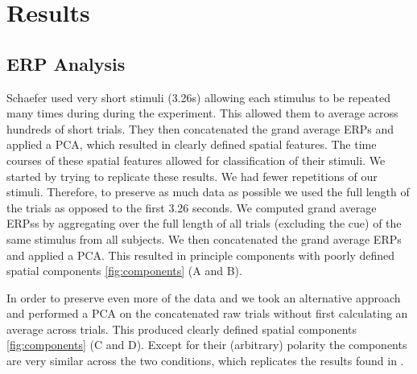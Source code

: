 \section*{Results}
\subsection*{ERP Analysis}
Schaefer \etal \cite{schaefer_name_2011} used very short stimuli (3.26s) allowing each stimulus to be repeated many times during during the experiment. 
This allowed them to average across hundreds of short trials. 
They then concatenated the grand average ERPs and applied a \ac{PCA}, which resulted in clearly defined spatial features. The time courses of these spatial features allowed for classification of their stimuli. We started by trying to replicate these results. 
We had fewer repetitions of our stimuli. Therefore, to preserve as much data as possible we used the full length of the trials as opposed to the first 3.26 seconds. We computed grand average \acp{ERP}s by aggregating over the full length of all trials (excluding the cue) of the same stimulus from all subjects. We then concatenated the grand average \acp{ERP} and applied a \ac{PCA}. This resulted in principle components with poorly defined spatial components \autoref{fig:components} (A and B).

In order to preserve even more of the data and we took an alternative approach and performed a \ac{PCA} on the concatenated raw trials without first calculating an average across trials. This produced clearly defined spatial components \autoref{fig:components} (C and D). Except for their (arbitrary) polarity the components are very similar across the two conditions, which replicates the results found in \cite{schaefer_name_2011}.

